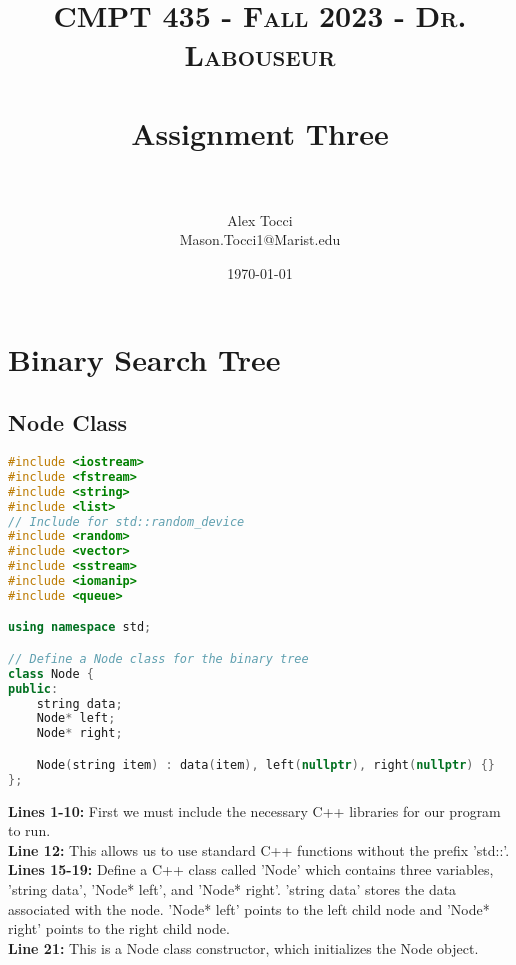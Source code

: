 \documentclass[letterpaper, 10pt,DIV=13]{scrartcl}
\title{	
   \normalfont \normalsize 
   \textsc{CMPT 435 - Fall 2023 - Dr. Labouseur} \\[10pt] %
   \horrule{0.5pt} \\[0.25cm] 	%
   \huge Assignment Three  \\     	    %
   \horrule{0.5pt} \\[0.25cm] 	%
}
\author{Alex Tocci \\ \normalsize Mason.Tocci1@Marist.edu}
\date{\normalsize\today} 	%
\numberwithin{equation}{section} %
\numberwithin{figure}{section} %
\numberwithin{table}{section} %
\begin{document}
\maketitle %

\section{Binary Search Tree}
\subsection{Node Class}
\begin{linenumbers}
\begin{lstlisting}[language=C++, caption={Node Class}, label={code:example}]
#include <iostream>
#include <fstream>
#include <string>
#include <list>
// Include for std::random_device
#include <random>
#include <vector>
#include <sstream>
#include <iomanip>
#include <queue>

using namespace std;

// Define a Node class for the binary tree
class Node {
public:
    string data;
    Node* left;
    Node* right;

    Node(string item) : data(item), left(nullptr), right(nullptr) {}
};
\end{lstlisting}
\end{linenumbers}
\nolinenumbers

\textbf{Lines 1-10:} First we must include the necessary C++ libraries for our program to run. \\
\textbf{Line 12:} This allows us to use standard C++ functions without the prefix 'std::'. \\
\textbf{Lines 15-19:} Define a C++ class called 'Node' which contains three variables, 'string data', 'Node* left', and 'Node* right'. 'string data' stores the data associated with the node. 'Node* left' points to the left child node and 'Node* right' points to the right child node. \\
\textbf{Line 21:} This is a Node class constructor, which initializes the Node object.
\end{document}
